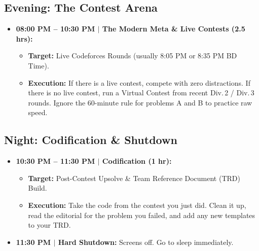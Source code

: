 \documentclass[12pt, a4paper]{article}
\begin{document}
\subsection{Evening: The Contest Arena}

\begin{itemize}[leftmargin=2em, itemsep=6pt]

  \item \textbf{08:00 PM -- 10:30 PM $|$ The Modern Meta \& Live Contests
        (2.5 hrs):}
    \begin{itemize}
      \item \textbf{Target:} Live Codeforces Rounds
            (usually 8:05 PM or 8:35 PM BD Time).
      \item \textbf{Execution:} If there is a live contest, compete with zero
            distractions. If there is no live contest, run a Virtual Contest
            from recent Div.\,2 / Div.\,3 rounds. Ignore the 60-minute rule
            for problems A and B to practice raw speed.
    \end{itemize}

\end{itemize}

\subsection{Night: Codification \& Shutdown}

\begin{itemize}[leftmargin=2em, itemsep=6pt]

  \item \textbf{10:30 PM -- 11:30 PM $|$ Codification (1 hr):}
    \begin{itemize}
      \item \textbf{Target:} Post-Contest Upsolve \& Team Reference Document
            (TRD) Build.
      \item \textbf{Execution:} Take the code from the contest you just did.
            Clean it up, read the editorial for the problem you failed, and add
            any new templates to your TRD.
    \end{itemize}

  \item \textbf{11:30 PM $|$ Hard Shutdown:} Screens off. Go to sleep
        immediately.

\end{itemize}
\end{document}

